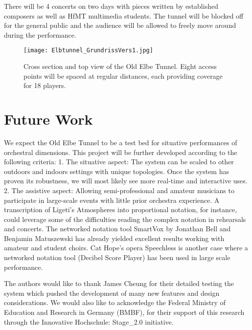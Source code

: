 There will be 4 concerts on two days with pieces written by established composers as well as HfMT multimedia students. The tunnel will be blocked off for the general public and the audience will be allowed to freely move around during the performance.

\begin{figure*}[h]
    \centering
    \begin{minipage}{1.\textwidth}
        \centering
        \texttt{[image: Elbtunnel\_GrundrissVers1.jpg]} 
       	\caption{Cross section and top view of the Old Elbe Tunnel. Eight access points will be spaced at regular distances, each providing coverage for 18 players.
\label{fig:Elbtunnel_GrundrissVers1.jpg}}
    \end{minipage}
\end{figure*}


\section{Future Work}
We expect the Old Elbe Tunnel to be a test bed for situative performances of orchestral dimensions. This project will be further developed according to the following criteria: 
1. The situative aspect: The system can be scaled to other outdoors and indoors settings with unique topologies. Once the system has proven its robustness, we will  most likely see more real-time and interactive uses.
2. The assistive aspect: Allowing semi-professional and amateur musicians to participate in large-scale events with little prior orchestra experience. A transcription of Ligeti's Atmospheres into proportional notation, for instance, could leverage some of the difficulties reading the complex notation in rehearsals and concerts. The networked notation tool SmartVox by Jonathan Bell and Benjamin Matuszewski has already yielded excellent results working with amateur and student choirs. Cat Hope's opera Speechless is another case where a networked notation tool (Decibel Score Player) has been used in large scale performance.
 


\begin{acknowledgments}
The authors would like to thank James Cheung for their detailed testing the system which pushed the development of many new features and design considerations. We would also like to acknowledge the Federal Ministry of Education and Research in Germany (BMBF), for their support of this research through the Innovative Hochschule: Stage\_2.0 initiative.
\end{acknowledgments} 

\balance






